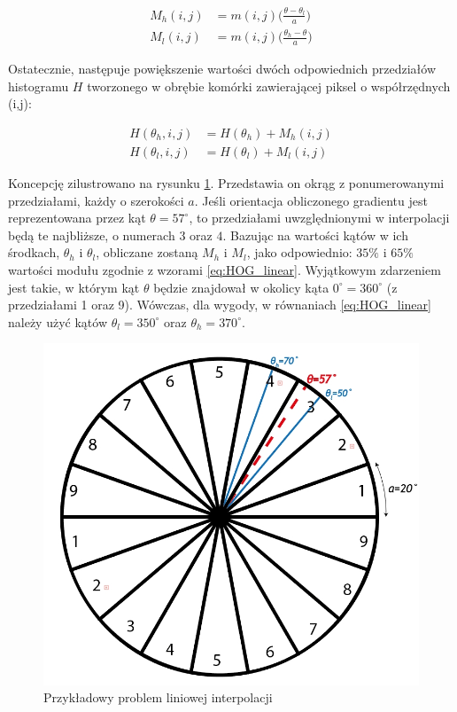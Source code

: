 \begin{equation}
\label{eq:HOG_linear}
\left.\begin{aligned}
M_h(i,j)&=m(i,j)\bigg(\frac{\theta-\theta_l}{a}\bigg)\\
M_l(i,j)&=m(i,j)\bigg(\frac{\theta_h-\theta}{a}\bigg)
\end{aligned}\right.
\end{equation}

Ostatecznie, następuje powiększenie wartości dwóch odpowiednich przedziałów histogramu $H$ tworzonego w obrębie komórki zawierającej piksel o współrzędnych (i,j):

\begin{equation}
\label{eq:HOG_increment}
\left.\begin{aligned} 
H(\theta_h,i,j)&=H(\theta_h)+M_h(i,j) \\ 
H(\theta_l,i,j)&=H(\theta_l)+M_l(i,j)
\end{aligned}\right.
\end{equation}

Koncepcję zilustrowano na rysunku \ref{fig:HOG_interpolation}.  %
Przedstawia on okrąg z ponumerowanymi przedziałami, każdy o szerokości $a$. Jeśli orientacja obliczonego gradientu jest reprezentowana przez kąt $\theta=57^{\circ}$, to przedziałami uwzględnionymi w interpolacji będą te najbliższe, o numerach $3$ oraz $4$. Bazując na wartości kątów w ich środkach, $\theta_h$ i $\theta_l$, obliczane zostaną $M_h$ i $M_l$, jako odpowiednio: $35\%$ i $65\%$ wartości modułu zgodnie z wzorami \eqref{eq:HOG_linear}.
Wyjątkowym zdarzeniem jest takie, w którym kąt $\theta$ będzie znajdował w okolicy kąta $0^{\circ}=360^{\circ}$ (z przedziałami 1 oraz 9). 
Wówczas, dla wygody, w równaniach \eqref{eq:HOG_linear} należy użyć kątów $\theta_l=350^{\circ}$ oraz $\theta_h=370^{\circ}$.

\begin{figure}[h]
	\centering
	\hspace*{1cm}
	\includegraphics[width=12cm]{2_HOG_interpolation.jpg}
	\caption{Przykładowy problem liniowej interpolacji}
	\label{fig:HOG_interpolation}
\end{figure}

